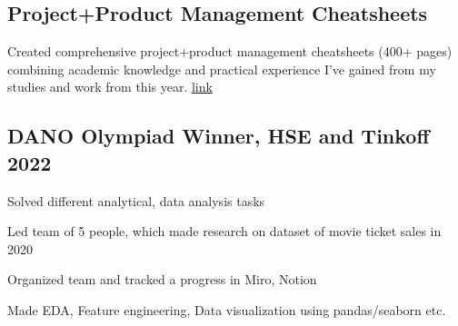\documentclass[a4paper, 12pt]{article}
\begin{document}
\subsection {{Project+Product Management Cheatsheets}}
\begin{zitemize}
\item Created comprehensive project+product management cheatsheets (400+ pages) combining academic knowledge and practical experience I've gained from my studies and work from this year.
\href{http://slavikss.github.io/blog/}{link}
\end{zitemize}

\subsection{{DANO Olympiad Winner, HSE and Tinkoff }\hfill 2022}
\begin{zitemize}
\item Solved different analytical, data analysis tasks
\item Led team of 5 people, which made research on dataset of movie ticket sales in 2020
\item Organized team and tracked a progress in Miro, Notion
\item Made EDA, Feature engineering, Data visualization using pandas/seaborn etc.
\end{zitemize}
\end{document}
